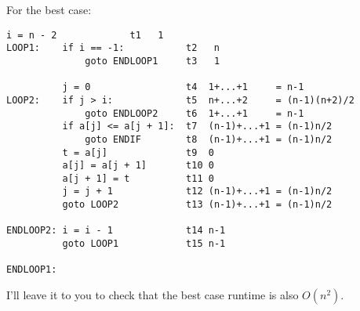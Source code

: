 For the best case:
{\footnotesize
\begin{Verbatim}[frame=single, fontsize=\footnotesize]
          i = n - 2             t1   1
LOOP1:    if i == -1:           t2   n
              goto ENDLOOP1     t3   1

          j = 0                 t4  1+...+1     = n-1
LOOP2:    if j > i:             t5  n+...+2     = (n-1)(n+2)/2
              goto ENDLOOP2     t6  1+...+1     = n-1
          if a[j] <= a[j + 1]:  t7  (n-1)+...+1 = (n-1)n/2
              goto ENDIF        t8  (n-1)+...+1 = (n-1)n/2
          t = a[j]              t9  0
          a[j] = a[j + 1]       t10 0
          a[j + 1] = t          t11 0
          j = j + 1             t12 (n-1)+...+1 = (n-1)n/2
          goto LOOP2            t13 (n-1)+...+1 = (n-1)n/2
                                  
ENDLOOP2: i = i - 1             t14 n-1
          goto LOOP1            t15 n-1

ENDLOOP1:
\end{Verbatim}
}
I'll leave it to you to check that the best case runtime is also 
$O(n^2)$.















